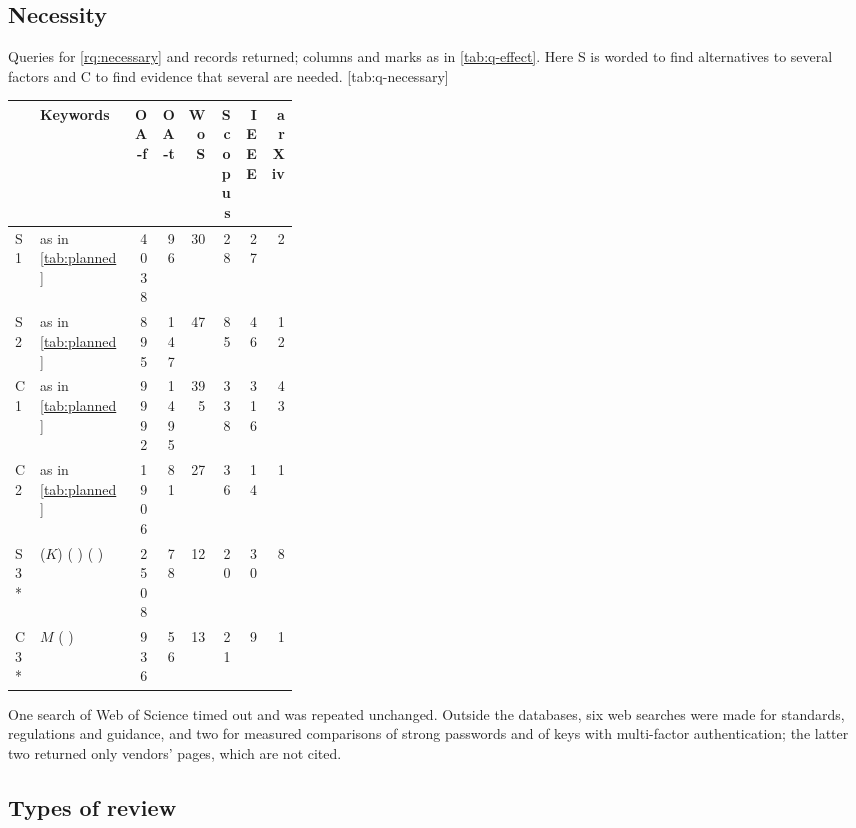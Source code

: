 

\clearpage
\subsection{Necessity}

\begin{table}[h]
  \begin{sidecaption}{%
    Queries for \cref{rq:necessary} and records returned; columns and
    marks as in \cref{tab:q-effect}.
    Here S is worded to find alternatives to several factors and C to
    find evidence that several are needed.
  }[tab:q-necessary]
    \footnotesize
    \begin{tabular}{@{}lL{0.33\linewidth}rrrrrr@{}}
      \toprule
      & Keywords & OA-f & OA-t & WoS & Scopus & IEEE & arXiv \\
      \midrule
      S1 & as in \cref{tab:planned} & 4038 & 96 & 30 & 28 & 27 & 2 \\
      S2 & as in \cref{tab:planned} & 895 & 147 & 47 & 85 & 46 & 12 \\
      C1 & as in \cref{tab:planned} & 9992 & 1495 & 395 & 338 & 316 & 43 \\
      C2 & as in \cref{tab:planned} & 1906 & 81 & 27 & 36 & 14 & 1 \\
      S3* & ($K$)  (  
         )  (
            
        )
        & 2508 & 78 & 12 & 20 & 30 & 8 \\
      C3* & $M$  ( 
           
        )
        & 936 & 56 & 13 & 21 & 9 & 1 \\
      \bottomrule
    \end{tabular}
  \end{sidecaption}
\end{table}
One search of Web of Science timed out and was repeated unchanged.
Outside the databases, six web searches were made for standards,
regulations and guidance, and two for measured comparisons of strong
passwords and of keys with multi-factor authentication; the latter two
returned only vendors' pages, which are not cited.



\clearpage
\subsection{Types of review}\label{sec:hits-method}

